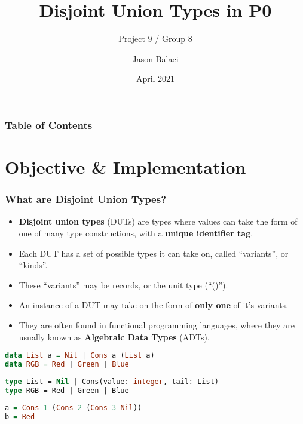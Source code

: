 \documentclass{beamer}
\title[Disjoint Union Types]{Disjoint Union Types in P0}
\subtitle{Project 9 / Group 8}
\author{Jason Balaci}
\institute{McMaster University}
\date{April 2021}
\begin{document}
\frame{\titlepage}

\begin{frame}
\frametitle{Table of Contents}
\tableofcontents
\end{frame}

\section{Objective \& Implementation}

\begin{frame}
\frametitle{What are Disjoint Union Types?}

\begin{itemize}
 \item<1-> \textbf{Disjoint union types} (DUTs) are types where values can take the form of one of many type constructions, with a \textbf{unique identifier tag}.
 \item<2-> Each DUT has a set of possible types it can take on, called ``variants'', or ``kinds''.
 \item<3-> These ``variants'' may be records, or the unit type (``()'').
 \item<4-> An instance of a DUT may take on the form of \textbf{only one} of it's variants. 
 \item<5-> They are often found in functional programming languages, where they are usually known as \textbf{Algebraic Data Types} (ADTs).
\end{itemize}

\end{frame}

\begin{lrbox}{\haskellTypes}
\begin{lstlisting}[language=Haskell, basicstyle=\footnotesize]
data List a = Nil | Cons a (List a)
data RGB = Red | Green | Blue
\end{lstlisting}
\end{lrbox}

\begin{lrbox}{\pZeroTypes}
\begin{lstlisting}[language=Pascal, basicstyle=\footnotesize]
type List = Nil | Cons(value: integer, tail: List)
type RGB = Red | Green | Blue
\end{lstlisting}
\end{lrbox}


\begin{lrbox}{\haskellTypesInst}
\begin{lstlisting}[language=Haskell, basicstyle=\footnotesize]
a = Cons 1 (Cons 2 (Cons 3 Nil))
b = Red
\end{lstlisting}
\end{lrbox}
\end{document}
